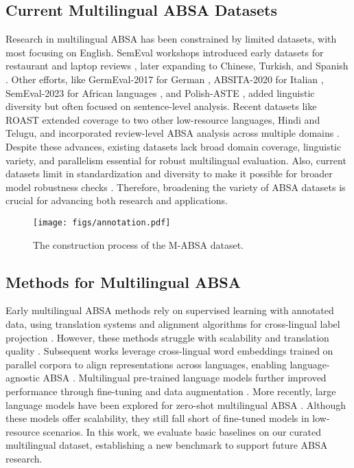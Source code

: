 \subsection{Current Multilingual ABSA Datasets} 
Research in multilingual ABSA has been constrained by limited datasets, with most focusing on English. SemEval workshops introduced early datasets for restaurant and laptop reviews \citep{pontiki-etal-2014-semeval, pontiki-etal-2015-semeval}, later expanding to Chinese, Turkish, and Spanish \citep{pontiki-etal-2016-semeval}. Other efforts, like GermEval-2017 for German \citep{wojatzki2017germeval}, ABSITA-2020 for Italian \citep{de2020ate}, SemEval-2023 for African languages \citep{muhammad2023semeval}, and Polish-ASTE \cite{lango-etal-2024-polish}, added linguistic diversity but often focused on sentence-level analysis. Recent datasets like ROAST extended coverage to two other low-resource languages, Hindi and Telugu, and incorporated review-level ABSA analysis across multiple domains \citep{chebolu2024roast}. Despite these advances, existing datasets lack broad domain coverage, linguistic variety, and parallelism essential for robust multilingual evaluation. Also, current datasets limit in standardization and diversity to make it possible for broader model robustness checks \cite{chebolu-etal-2023-review}. Therefore, broadening the variety of ABSA datasets is crucial for advancing both research and applications.


\begin{figure*}[htbp] 
\centering 
\texttt{[image: figs/annotation.pdf]} 
\caption{The construction process of the M-ABSA dataset.} 
\label{fig:construction_process} 
\end{figure*}

\subsection{Methods for Multilingual ABSA}
Early multilingual ABSA methods rely on supervised learning with annotated data, using translation systems and alignment algorithms for cross-lingual label projection \citep{lin2014cross, klinger2015instance, lambert2015aspect, barnes2016exploring}. However, these methods struggle with scalability and translation quality \citep{zhou2015clopinionminer}. Subsequent works leverage cross-lingual word embeddings trained on parallel corpora to align representations across languages, enabling language-agnostic ABSA \citep{barnes2016exploring, wang2018transition}. Multilingual pre-trained language models
further improved performance through fine-tuning and data augmentation \citep{xu2019bert, phan2021exploring}. More recently, large language models have been explored for zero-shot multilingual ABSA \citep{wu2024evaluating}. Although these models offer scalability, they still fall short of fine-tuned models in low-resource scenarios. In this work, we evaluate basic baselines on our curated multilingual dataset, establishing a new benchmark to support future ABSA research.
